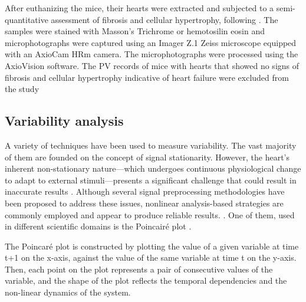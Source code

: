 \documentclass[%
preprint,
 amsmath,amssymb,
 aps,
]{revtex4-2}
\begin{document}
After euthanizing the mice, their hearts were extracted and subjected to a semi-quantitative assessment of fibrosis and cellular hypertrophy, following \citet{Ruiz_Esparza_2016}. The samples were stained with Masson’s Trichrome or hemotosilin eosin and microphotographs were captured using an Imager Z.1 Zeiss microscope equipped with an AxioCam HRm camera. The microphotographs were processed using the AxioVision software. The PV records of mice with hearts that showed no signs of fibrosis and cellular hypertrophy indicative of heart failure were excluded from the study

\subsection{Variability analysis}

A variety of techniques have been used to measure variability. The vast majority of them are founded on the concept of signal stationarity. However, the heart's inherent non-stationary nature---which undergoes continuous physiological change to adapt to external stimuli---presents a significant challenge that could result in inaccurate results \citep{Marwan_2007}. Although several signal preprocessing methodologies have been proposed to address these issues, nonlinear analysis-based strategies are commonly employed and appear to produce reliable results. \citep{Marwan_2002, Aubert_2003, Marwan_2007, Giuliani_1998, 
Rajendra_Acharya_2006, Webber_1994, Henriques_2020}. One of them, used in different scientific domains is the Poincairé plot \citep{Hoshi_2016, Webber_1994, Voss_2008}. 


The Poincaré plot is constructed by plotting the value of a given variable at time t+1 on the x-axis, against the value of the same variable at time t on the y-axis. Then, each point on the plot represents a pair of consecutive values of the variable, and the shape of the plot reflects the temporal dependencies and the non-linear dynamics of the system.

\end{document}
